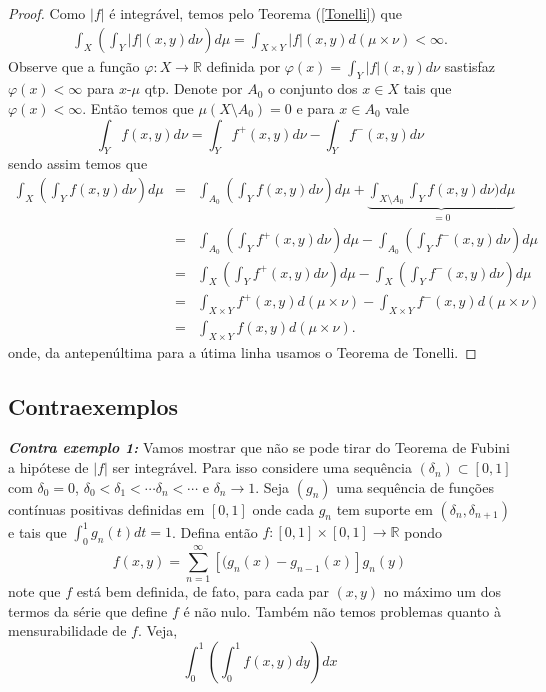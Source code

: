 \begin{proof}
Como $|f|$ é integrável, temos pelo Teorema (\ref{Tonelli}) que 
\begin{eqnarray}\label{Fubini 2}
\int_X(\int_Y |f|(x,y) d\nu)d\mu=\int_{X\times Y}|f|(x,y) d(\mu\times \nu)<\infty.
\end{eqnarray}
Observe que a função $\varphi:X\to \mathbb{R}$ definida por $\varphi(x)=\int_Y |f|(x,y) d\nu$ sastisfaz 
$\varphi(x)<\infty$ para $x$-$\mu$ qtp.  Denote por $A_0$ o conjunto dos $x\in X$ tais que $\varphi(x)<\infty$. Então temos que 
$\mu(X\setminus A_0)=0
$ e para $x\in A_0$ vale  
\begin{equation}
\int_Y f(x,y) d\nu=\int_{Y}f^{+}(x,y)d\nu-\int_Y f^{-}(x,y)d\nu
\end{equation}
sendo assim temos que 
\begin{eqnarray*}
\int_X (\int_Y f(x,y)d\nu)d\mu&=&\int_{A_0}(\int_Y f(x,y)d\nu)d\mu+\underbrace{\int_{X\setminus A_0}\int_Y f(x,y)d\nu)d\mu}_{=0}
\\
&
=
&
\int_{A_0}(\int_{Y}f^{+}(x,y)d\nu)d\mu-\int_{A_0}(\int_{Y}f^{-}(x,y)d\nu)d\mu
\\[3mm]
&
=
&
\int_{X}(\int_{Y}f^{+}(x,y)d\nu)d\mu-\int_{X}(\int_{Y}f^{-}(x,y)d\nu)d\mu
\\[3mm]
&
=
&
\int_{X\times Y}f^{+}(x,y)d(\mu\times \nu)-\int_{X\times Y}f^{-}(x,y)d(\mu\times \nu)
\\[3mm]
&
=
&
\int_{X\times Y}f(x,y) d(\mu\times \nu).
\end{eqnarray*}
onde, da antepenúltima para a útima linha usamos o Teorema de Tonelli.
\end{proof}


\subsection{Contraexemplos}


\noindent\emph{\textbf{Contra exemplo 1:}} Vamos mostrar que não se pode tirar do Teorema de Fubini a hipótese de $|f|$ ser integrável. Para isso considere uma sequência $(\delta_n)\subset [0,1]$ com $\delta_0=0$, $\delta_0<\delta_1<\cdots \delta_n<\cdots $ e $\delta_n\to 1$. Seja $(g_n)$ uma sequência de funções contínuas positivas definidas em $[0,1]$ onde cada $g_n$ tem suporte em $(\delta_n,\delta_{n+1})$ e tais que 
$\int_{0}^{1}g_n(t)dt=1$. Defina então $f:[0,1]\times [0,1]\to \mathbb{R}$ pondo 
$$
f(x,y)=\sum_{n=1}^{\infty}[(g_n(x)-g_{n-1}(x)]g_n(y)
$$
note que $f$ está bem definida, de fato, para cada par $(x,y)$ no máximo um dos termos da série que define $f$ é não nulo. Também não temos problemas quanto à mensurabilidade de $f$. Veja, 
$$
\int_{0}^1(\int_{0}^{1}f(x,y)dy)dx
$$
